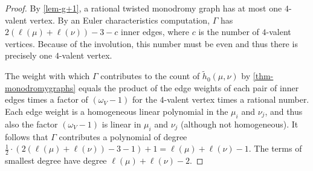 \documentclass[ALCO,published]{cedram}
\begin{document}
 \begin{proof}
 By \cref{lem-g+1}, a rational twisted monodromy graph has at most one $4$-valent vertex. By an Euler characteristics computation, $\Gamma$ has $2(\ell(\mu)+\ell(\nu))-3-c$ inner edges, where $c$ is the number of $4$-valent vertices. Because of the involution, this number must be even and thus there is precisely one $4$-valent vertex.
 
 The weight with which $\Gamma$ contributes to the count of $\tilde{h}_0(\mu,\nu)$ by \cref{thm-monodromygraphs} equals the product of the edge weights of each pair of inner edges times a factor of $(\omega_V-1)$ for the $4$-valent vertex times a rational number.
 Each edge weight is a homogeneous linear polynomial in the $\mu_i$ and $\nu_j$, and thus also the factor $(\omega_V-1)$ is linear in $\mu_i$ and $\nu_j$ (although not homogeneous).
 It follows that $\Gamma$ contributes a polynomial of degree $\frac{1}{2}\cdot (2(\ell(\mu)+\ell(\nu))-3-1)+1= \ell(\mu)+\ell(\nu)-1$. The terms of smallest degree have degree $\ell(\mu)+\ell(\nu)-2$.
 \end{proof}
\end{document}
